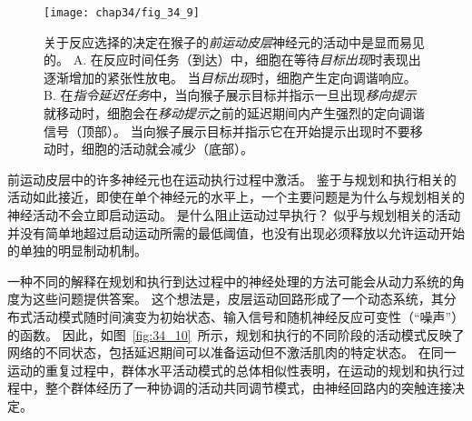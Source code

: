 \begin{figure}[htbp]
	\centering
	\texttt{[image: chap34/fig\_34\_9]}
	\caption{关于反应选择的决定在猴子的\textit{前运动皮层}神经元的活动中是显而易见的\cite{crammond2000prior}。
		A. 在反应时间任务（到达）中，细胞在等待\textit{目标出现}时表现出逐渐增加的紧张性放电。
		当\textit{目标出现}时，细胞产生定向调谐响应。
		B. 在\textit{指令延迟任务}中，当向猴子展示目标并指示一旦出现\textit{移向提示}就移动时，细胞会在\textit{移动提示}之前的延迟期间内产生强烈的定向调谐信号（顶部）。
		当向猴子展示目标并指示它在开始提示出现时不要移动时，细胞的活动就会减少（底部）。}
	\label{fig:34_9}
\end{figure}


前运动皮层中的许多神经元也在运动执行过程中激活。
鉴于与规划和执行相关的活动如此接近，即使在单个神经元的水平上，一个主要问题是为什么与规划相关的神经活动不会立即启动运动。
是什么阻止运动过早执行？
似乎与规划相关的活动并没有简单地超过启动运动所需的最低阈值，也没有出现必须释放以允许运动开始的单独的明显制动机制。


一种不同的解释在规划和执行到达过程中的神经处理的方法可能会从动力系统的角度为这些问题提供答案。
这个想法是，皮层运动回路形成了一个动态系统，其分布式活动模式随时间演变为初始状态、输入信号和随机神经反应可变性（“噪声”）的函数。
因此，如图~\ref{fig:34_10}~所示，规划和执行的不同阶段的活动模式反映了网络的不同状态，包括延迟期间可以准备运动但不激活肌肉的特定状态。
在同一运动的重复过程中，群体水平活动模式的总体相似性表明，在运动的规划和执行过程中，整个群体经历了一种协调的活动共同调节模式，由神经回路内的突触连接决定。


